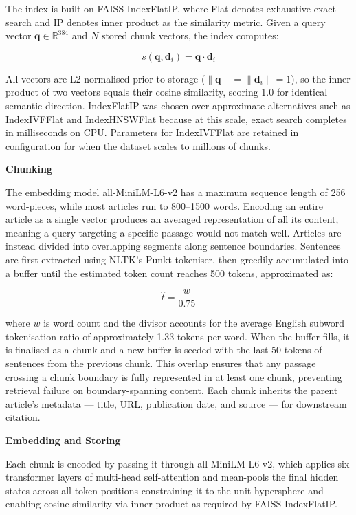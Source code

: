 The index is built on FAISS IndexFlatIP, where Flat denotes exhaustive exact search and IP denotes inner product as the similarity metric. Given a query vector $\mathbf{q} \in \mathbb{R}^{384}$ and $N$ stored chunk vectors, the index computes:

\begin{equation}
    s(\mathbf{q}, \mathbf{d}_i) = \mathbf{q} \cdot \mathbf{d}_i
\end{equation}

All vectors are L2-normalised prior to storage ($\|\mathbf{q}\| = \|\mathbf{d}_i\| = 1$), so the inner product of two vectors equals their cosine similarity, scoring 1.0 for identical semantic direction. IndexFlatIP was chosen over approximate alternatives such as IndexIVFFlat and IndexHNSWFlat because at this scale, exact search completes in milliseconds on CPU. Parameters for IndexIVFFlat are retained in configuration for when the dataset scales to millions of chunks.

\textbf{Chunking}

The embedding model all-MiniLM-L6-v2 has a maximum sequence length of 256 word-pieces, while most articles run to 800--1500 words. Encoding an entire article as a single vector produces an averaged representation of all its content, meaning a query targeting a specific passage would not match well. Articles are instead divided into overlapping segments along sentence boundaries. Sentences are first extracted using NLTK's Punkt tokeniser, then greedily accumulated into a buffer until the estimated token count reaches 500 tokens, approximated as:

\begin{equation}
    \hat{t} = \frac{w}{0.75}
\end{equation}

where $w$ is word count and the divisor accounts for the average English subword tokenisation ratio of approximately 1.33 tokens per word. When the buffer fills, it is finalised as a chunk and a new buffer is seeded with the last 50 tokens of sentences from the previous chunk. This overlap ensures that any passage crossing a chunk boundary is fully represented in at least one chunk, preventing retrieval failure on boundary-spanning content. Each chunk inherits the parent article's metadata --- title, URL, publication date, and source --- for downstream citation.

\textbf{Embedding and Storing}

Each chunk is encoded by passing it through all-MiniLM-L6-v2, which applies six transformer layers of multi-head self-attention and mean-pools the final hidden states across all token positions constraining it to the unit hypersphere and enabling cosine similarity via inner product as required by FAISS IndexFlatIP. 

